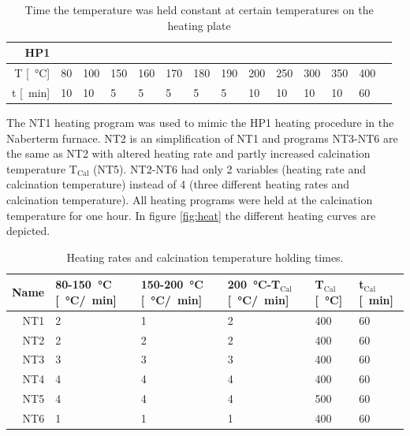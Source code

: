 \documentclass[a4paper]{article}
\newcommand{\td}[1]{\textcolor{red}{#1}}
\newcommand{\minutes}[1]{\SI{#1}{\minute}}
\newcommand{\oc}[1]{\SI{#1}{\degreeCelsius}}
\begin{document}
\begin{table}[h]
	\centering
	\begin{tabular}{rl ll ll ll ll ll ll }%
		HP1		&&&&&&&&&&&&&\\
		\hline
		T [\oc{}]	    &80		&100	&150	&160	&170 	&180	&190	&200	&250	&300	&350	&400	\\
		t [\minutes{}]	&10 	&10		&5 		&5 		&5 		&5 &5 &10 &10 &10 &10 &60 \\
		\hline
	\end{tabular}
	\caption{Time the temperature was held constant at certain temperatures on the heating plate}
	\label{tab:labtech}
\end{table}
%
The NT1 heating program was used to mimic the HP1 heating procedure in the Naberterm furnace. 
NT2 is an simplification of NT1 and programs NT3-NT6 are the same as NT2 with altered heating rate and partly increased calcination temperature T$_{\textrm{Cal}}$ (NT5).
NT2-NT6 had only 2 variables (heating rate and calcination temperature) instead of 4 (three different heating rates and calcination temperature). 
All heating programs were held at the calcination temperature for one hour.
In figure \ref{fig:heat} the different heating curves are depicted. 
%
%
\begin{table}[h]
	\centering
	\begin{tabular}{rl ll ll}%
		\hline\hline
		Name	&80-150\oc{} [\oc{}/\minutes{}]	&150-200\oc{} [\oc{}/\minutes{}]	&200\oc{}-T$_{\textrm{Cal}}$ [\oc{}/\minutes{}]	&T$_{\textrm{Cal}}$ [\oc{}] &t$_{\textrm{Cal}}$ [\minutes{}]	\\
		\hline
		NT1		&2					&1					&2				&400	&60  \\
		NT2		&2					&2					&2				&400	&60  \\
		NT3		&3					&3					&3				&400	&60  \\
		NT4		&4					&4					&4				&400	&60  \\
		NT5		&4					&4					&4				&500	&60  \\
		NT6		&1					&1					&1				&400	&60  \\
		\hline\hline
	\end{tabular}
	\caption{Heating rates and calcination temperature holding times.}
	\label{tab:nt}
\end{table}
\end{document}
